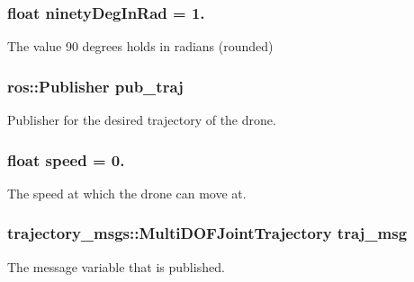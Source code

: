 \subsubsection[{\texorpdfstring{ninety\+Deg\+In\+Rad}{ninetyDegInRad}}]{\setlength{\rightskip}{0pt plus 5cm}float ninety\+Deg\+In\+Rad = 1.}\hypertarget{oculus-control-keyboard_8cpp_a2cce9b626fdb3b1f78baad955bd5b609}{}\label{oculus-control-keyboard_8cpp_a2cce9b626fdb3b1f78baad955bd5b609}


The value 90 degrees holds in radians (rounded) 

\subsubsection[{\texorpdfstring{pub\+\_\+traj}{pub_traj}}]{\setlength{\rightskip}{0pt plus 5cm}ros\+::\+Publisher pub\+\_\+traj}\hypertarget{oculus-control-keyboard_8cpp_a92b67ae724bc0d23b8e85e92e89403df}{}\label{oculus-control-keyboard_8cpp_a92b67ae724bc0d23b8e85e92e89403df}


Publisher for the desired trajectory of the drone. 

\subsubsection[{\texorpdfstring{speed}{speed}}]{\setlength{\rightskip}{0pt plus 5cm}float speed = 0.}\hypertarget{oculus-control-keyboard_8cpp_a7f7e4724cf57d59513b39c5ecc81adc8}{}\label{oculus-control-keyboard_8cpp_a7f7e4724cf57d59513b39c5ecc81adc8}


The speed at which the drone can move at. 

\subsubsection[{\texorpdfstring{traj\+\_\+msg}{traj_msg}}]{\setlength{\rightskip}{0pt plus 5cm}trajectory\+\_\+msgs\+::\+Multi\+D\+O\+F\+Joint\+Trajectory traj\+\_\+msg}\hypertarget{oculus-control-keyboard_8cpp_a090c0766fbb77862dd8cc0cca99d688b}{}\label{oculus-control-keyboard_8cpp_a090c0766fbb77862dd8cc0cca99d688b}


The message variable that is published. 

